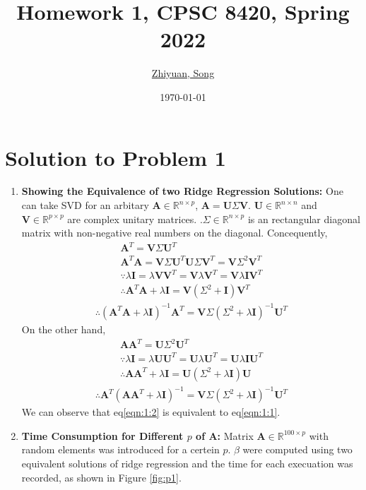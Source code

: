 \documentclass[11pt]{article}
\title{{\bf Homework 1, CPSC 8420, Spring 2022}} %
\author{\underline{Zhiyuan, Song}} %
\date{\today}
\newcommand{\R}{\mathbb{R}}
\newcommand{\mtx}[1]{\mathbf{#1}}
\def \mA {\mtx{A}}
\def \mI {\mtx{I}}
\def \mU {\mtx{U}}
\def \mV {\mtx{V}}
\def \R {\mathbb{R}}
\begin{document}
\maketitle

\section*{Solution to Problem 1}
\begin{enumerate}
	\item {\bf Showing the Equivalence of two Ridge Regression Solutions:} 
	One can take SVD for an arbitary $\mA\in\R^{n\times p}$, $\mA=\mU\Sigma\mV$. $\mU\in\R^{n\times n}$ and $\mV\in\R^{p\times p}$ are complex unitary matrices.   .$\Sigma\in\R^{n\times p}$ is an rectangular diagonal matrix with non-negative real numbers on the diagonal. Concequently,
	\begin{gather*}
		\mA^{T}=\mV\Sigma\mU^{T}\\
		\mA^{T}\mA=\mV\Sigma\mU^{T}\mU\Sigma\mV^{T}=\mV\Sigma^{2}\mV^{T}\\
		\because \lambda\mI=\lambda\mV\mV^{T}=\mV\lambda\mV^{T}=\mV\lambda\mI\mV^{T}\\
		\therefore \mA^{T}\mA+\lambda\mI=\mV(\Sigma^{2}+\mI)\mV^{T}
	\end{gather*}
	\begin{align}\label{eqn:1:1}
	\therefore (\mA^{T}\mA+\lambda\mI)^{-1}\mA^{T}=\mV\Sigma(\Sigma^{2}+\lambda\mI)^{-1}\mU^{T}
	\end{align}
	On the other hand,
	\begin{gather*}
	\mA\mA^{T}=\mU\Sigma^{2}\mU^{T}\\
	\because \lambda\mI=\lambda\mU\mU^{T}=\mU\lambda\mU^{T}=\mU\lambda\mI\mU^{T}\\
	\therefore \mA\mA^{T}+\lambda\mI=\mU(\Sigma^{2}+\lambda\mI)\mU
	\end{gather*}
	\begin{align}\label{eqn:1:2}
	\therefore \mA^{T}(\mA\mA^{T}+\lambda\mI)^{-1}=\mV\Sigma(\Sigma^{2}+\lambda\mI)^{-1}\mU^{T}
	\end{align}
	We can observe that eq\ref{eqn:1:2} is equivalent to 	eq\ref{eqn:1:1}.
	\item {\bf Time Consumption for Different $p$ of $\mA$:} Matrix $\mA\in\R^{100\times p}$ with random elements was introduced for a certein $p$. $\beta$ were computed using two equivalent solutions of ridge regression and the time for each execuation was recorded, as shown in Figure \ref{fig:p1}.
	\begin{figure} %

\end{figure}
\end{enumerate}
\end{document}
